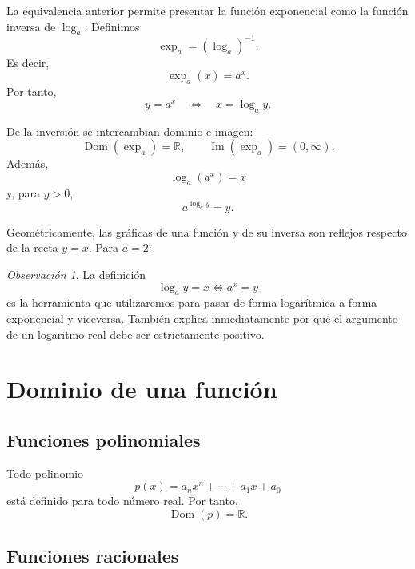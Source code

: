 \documentclass[12pt]{article}
\theoremstyle{remark}
\newtheorem{observacion}{Observación}[section]
\newcommand{\R}{\mathbb{R}}
\newcommand{\Dom}{\operatorname{Dom}}
\newcommand{\Ima}{\operatorname{Im}}
\begin{document}
La equivalencia anterior permite presentar la función exponencial como la
función inversa de $\log_a$. Definimos
\[
\boxed{\exp_a=(\log_a)^{-1}}.
\]
Es decir,
\[
\boxed{\exp_a(x)=a^x}.
\]
Por tanto,
\[
\boxed{y=a^x\quad\Longleftrightarrow\quad x=\log_a y}.
\]

De la inversión se intercambian dominio e imagen:
\[
\Dom(\exp_a)=\R,
\qquad
\Ima(\exp_a)=(0,\infty).
\]
Además,
\[
\log_a(a^x)=x
\]
y, para $y>0$,
\[
a^{\log_a y}=y.
\]

Geométricamente, las gráficas de una función y de su inversa son reflejos
respecto de la recta $y=x$. Para $a=2$:

\begin{center}
\end{center}

\begin{observacion}
La definición
\[
\log_a y=x\Longleftrightarrow a^x=y
\]
es la herramienta que utilizaremos para pasar de forma logarítmica a forma
exponencial y viceversa. También explica inmediatamente por qué el argumento
de un logaritmo real debe ser estrictamente positivo.
\end{observacion}

\section{Dominio de una funci\'on}
\subsection*{Funciones polinomiales}

Todo polinomio
\[
p(x)=a_nx^n+\cdots+a_1x+a_0
\]
está definido para todo número real. Por tanto,
\[
\Dom(p)=\R.
\]

\subsection*{Funciones racionales}
\end{document}
